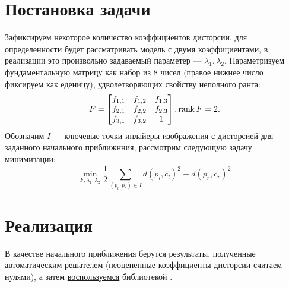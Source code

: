 \label{nonlinear}
\section{Постановка задачи}
Зафиксируем некоторое количество коэффициентов дисторсии, для определенности будет рассматривать модель с двумя коэффициентами, в реализации это произвольно задаваемый параметер --- $\lambda_1, 
\lambda_2$. Параметризуем фундаментальную матрицу как набор из 8 чисел (правое нижнее число фиксируем как еденицу), удволетворяющих свойству неполного ранга:
\begin{equation}
	F = \begin{bmatrix}
	f_{1,1} & f_{1,2} & f_{1,3} \\
	f_{2,1} & f_{2,2} & f_{2,3} \\
	f_{3,1} & f_{3,2} & 1 \\
	\end{bmatrix}, \operatorname{rank} F = 2.
\end{equation}
Обозначим $I$ --- ключевые точки-инлайеры изображения с дисторсией для заданного начального приближнния, рассмотрим следующую задачу минимизации: 
\begin{equation}
	\min\limits_{F, \lambda_1, \lambda_2} \frac{1}{2}\sum\limits_{\left(p_l, p_r\right) \in I} d\left(p_l, c_l\right)^2 + d\left(p_r, c_r\right)^2
\end{equation}

\section{Реализация}
В качестве начального приближения берутся результаты, полученные автоматическим решателем (неоцененные коэффициенты дисторсии считаем нулями), а затем \href{https://github.com/QuantumMechanicus/camera_calibration_test/blob/dev/subroutines/non_linear_optimizer/Non_Linear_Estimator.cpp}{воспользуемся} библиотекой \cite{ceres-solver}. 